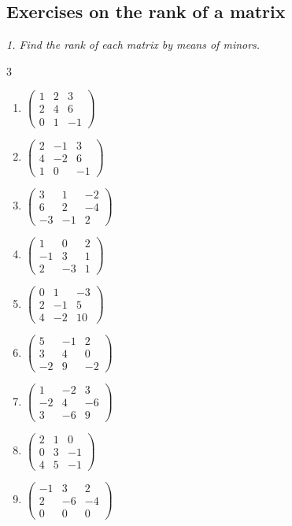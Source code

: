 \subsection{Exercises on the rank of a matrix}
\bigskip
\emph{1. Find the rank of each matrix by means of minors.}
\bigskip
\begin{multicols}{3}\raggedright
\begin{enumerate}[label=\arabic*.,  leftmargin=*]
\item $\begin{pmatrix}1&2&3\\2&4&6\\0&1&-1\end{pmatrix}$
\item $\begin{pmatrix}2&-1&3\\4&-2&6\\1&0&-1\end{pmatrix}$
\item $\begin{pmatrix}3&1&-2\\6&2&-4\\-3&-1&2\end{pmatrix}$
\item $\begin{pmatrix}1&0&2\\-1&3&1\\2&-3&1\end{pmatrix}$
\item $\begin{pmatrix}0&1&-3\\2&-1&5\\4&-2&10\end{pmatrix}$
\item $\begin{pmatrix}5&-1&2\\3&4&0\\-2&9&-2\end{pmatrix}$
\item $\begin{pmatrix}1&-2&3\\-2&4&-6\\3&-6&9\end{pmatrix}$
\item $\begin{pmatrix}2&1&0\\0&3&-1\\4&5&-1\end{pmatrix}$
\item $\begin{pmatrix}-1&3&2\\2&-6&-4\\0&0&0\end{pmatrix}$

\end{enumerate}
\end{multicols}
